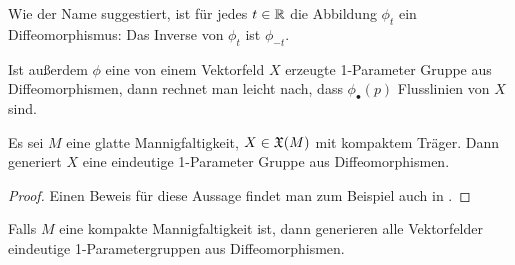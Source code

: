 \begin{remark}
    Wie der Name suggestiert, ist für jedes $t \in { \mathbb R }$ die Abbildung $\phi_t$ ein 
    Diffeomorphismus: Das Inverse von $\phi_t$ ist $\phi_{-t}$.

    Ist außerdem $\phi$ eine von einem Vektorfeld $X$ erzeugte 1-Parameter Gruppe aus 
    Diffeomorphismen, dann rechnet man leicht nach, dass $\phi_{\bullet}(p)$ Flusslinien 
    von $X$ sind.
\end{remark}

\begin{prop}
    \label{prop: kompaktes VF generiert 1-param. grp.}
    Es sei $M$ eine glatte Mannigfaltigkeit, $X \in { \mathfrak{X} } (M)$ mit kompaktem Träger. Dann 
    generiert $X$ eine eindeutige 1-Parameter Gruppe aus Diffeomorphismen.
\end{prop}

\begin{proof}
    Einen Beweis für diese Aussage findet man zum Beispiel auch in \cite{milnor}.
\end{proof}

\begin{remark}
    Falls $M$ eine kompakte Mannigfaltigkeit ist, dann generieren alle Vektorfelder eindeutige 
    1-Parametergruppen aus Diffeomorphismen.
\end{remark}




